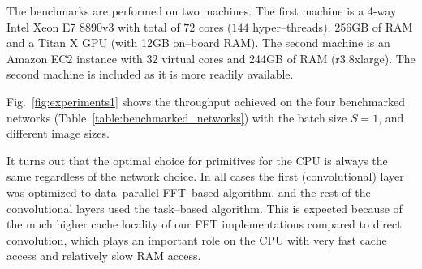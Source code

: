 \documentclass[conference]{./IEEEtran/IEEEtran}
\begin{document}
  The benchmarks are performed on two machines.  The first machine is
  a 4-way Intel Xeon E7 8890v3 with total of $72$ cores ($144$
  hyper--threads), 256GB of RAM and a Titan X GPU (with 12GB on--board
  RAM).  The second machine is an Amazon EC2 instance with $32$
  virtual cores and 244GB of RAM (r3.8xlarge).  The second machine is
  included as it is more readily available.

  Fig.~\ref{fig:experiments1} shows the throughput achieved on the
  four benchmarked networks (Table~\ref{table:benchmarked_networks})
  with the batch size $S=1$, and different image sizes.

  It turns out that the optimal choice for primitives for the CPU is
  always the same regardless of the network choice.  In all cases the
  first (convolutional) layer was optimized to data--parallel
  FFT--based algorithm, and the rest of the convolutional layers used
  the task--based algorithm.  This is expected because of the much
  higher cache locality of our FFT implementations compared to direct
  convolution, which plays an important role on the CPU with very fast
  cache access and relatively slow RAM access.


\end{document}
